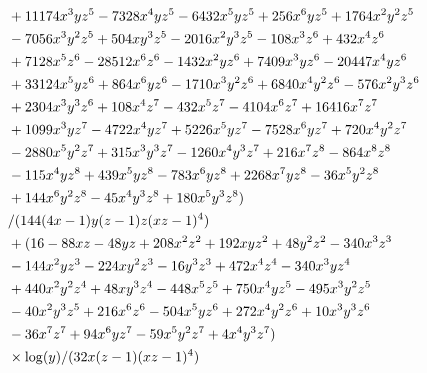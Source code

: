 \documentclass[letter,11pt,DIV=12,abstract=true,numbers=noenddot,titlepage=false,twocolumn=false,draft=false]{scrartcl}
\begin{document}
\begin{equation}
\begin{split}
      & \qquad \qquad \qquad + 11174 x^3 y z^5 - 7328 x^4 y z^5 - 6432 x^5 y z^5 + 256 x^6 y z^5 + 1764 x^2 y^2 z^5\\
      & \qquad \qquad \qquad - 7056 x^3 y^2 z^5 + 504 x y^3 z^5 - 2016 x^2 y^3 z^5 - 108 x^3 z^6 + 432 x^4 z^6\\
      & \qquad \qquad \qquad + 7128 x^5 z^6 - 28512 x^6 z^6 - 1432 x^2 y z^6 + 7409 x^3 y z^6 - 20447 x^4 y z^6\\
      & \qquad \qquad \qquad + 33124 x^5 y z^6 + 864 x^6 y z^6 - 1710 x^3 y^2 z^6 + 6840 x^4 y^2 z^6 - 576 x^2 y^3 z^6\\
      & \qquad \qquad \qquad + 2304 x^3 y^3 z^6 + 108 x^4 z^7 - 432 x^5 z^7 - 4104 x^6 z^7 + 16416 x^7 z^7\\
      & \qquad \qquad \qquad + 1099 x^3 y z^7 - 4722 x^4 y z^7 + 5226 x^5 y z^7 - 7528 x^6 y z^7 + 720 x^4 y^2 z^7\\
      & \qquad \qquad \qquad - 2880 x^5 y^2 z^7 + 315 x^3 y^3 z^7 - 1260 x^4 y^3 z^7 + 216 x^7 z^8 - 864 x^8 z^8\\
      & \qquad \qquad \qquad - 115 x^4 y z^8 + 439 x^5 y z^8 - 783 x^6 y z^8 + 2268 x^7 y z^8 - 36 x^5 y^2 z^8\\
      & \qquad \qquad \qquad + 144 x^6 y^2 z^8 - 45 x^4 y^3 z^8 + 180 x^5 y^3 z^8)\\
      & \qquad \qquad \qquad /(144 (4 x-1) y (z-1) z (x z-1)^4)\\
      & \qquad \qquad \qquad + (16 - 88 x z - 48 y z + 208 x^2 z^2 + 192 x y z^2 + 48 y^2 z^2 - 340 x^3 z^3\\
      & \qquad \qquad \qquad - 144 x^2 y z^3 - 224 x y^2 z^3 - 16 y^3 z^3 + 472 x^4 z^4 - 340 x^3 y z^4\\
      & \qquad \qquad \qquad + 440 x^2 y^2 z^4 + 48 x y^3 z^4 - 448 x^5 z^5 + 750 x^4 y z^5 - 495 x^3 y^2 z^5\\
      & \qquad \qquad \qquad - 40 x^2 y^3 z^5 + 216 x^6 z^6 - 504 x^5 y z^6 + 272 x^4 y^2 z^6 + 10 x^3 y^3 z^6\\
      & \qquad \qquad \qquad - 36 x^7 z^7 + 94 x^6 y z^7 - 59 x^5 y^2 z^7 + 4 x^4 y^3 z^7)\\
      & \qquad \qquad \qquad \times \log(y)/(32 x (z-1) (x z-1)^4)\\
\notag
\end{split}
\end{equation}
\end{document}
